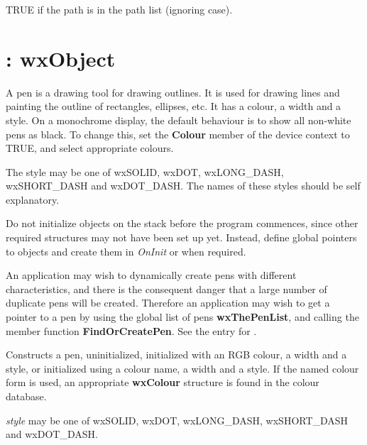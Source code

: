 TRUE if the path is in the path list (ignoring case).

\section{: wxObject}

A pen is a drawing tool for drawing outlines. It is used for drawing
lines and painting the outline of rectangles, ellipses, etc.  It has a
colour, a width and a style. On a monochrome display, the default
behaviour is to show all non-white pens as black. To change this,
set the {\bf Colour} member of the device context to TRUE, and select
appropriate colours.

The style may be one of wxSOLID, wxDOT, wxLONG\_DASH, wxSHORT\_DASH and
wxDOT\_DASH. The names of these styles should be self explanatory.

Do not initialize objects on the stack before the program commences,
since other required structures may not have been set up yet. Instead,
define global pointers to objects and create them in {\it OnInit} or
when required.

An application may wish to dynamically create pens with different
characteristics, and there is the consequent danger that a large number
of duplicate pens will be created. Therefore an application may wish to
get a pointer to a pen by using the global list of pens {\bf
wxThePenList}, and calling the member function {\bf FindOrCreatePen}.
See the entry for .

\label{wxpen}




Constructs a pen, uninitialized, initialized with an RGB colour, a
width and a style, or initialized using a colour name, a width and a
style.  If the named colour form is used, an appropriate {\bf
wxColour} structure is found in the colour database.

{\it style} may be one of wxSOLID, wxDOT, wxLONG\_DASH, wxSHORT\_DASH and
wxDOT\_DASH.



